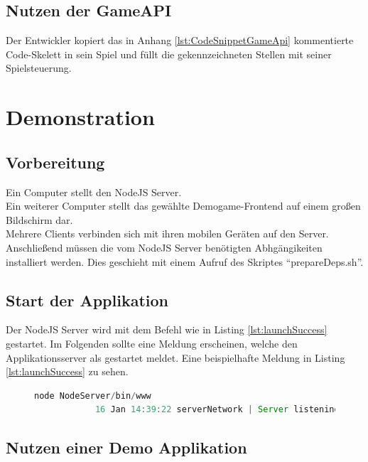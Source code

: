 \documentclass[a4paper]{spie}  %
\begin{document}
\subsection{Nutzen der GameAPI}
Der Entwickler kopiert das in Anhang \ref{lst:CodeSnippetGameApi} kommentierte Code-Skelett in sein Spiel und füllt die gekennzeichneten Stellen mit seiner Spielsteuerung.


\section{Demonstration}
\subsection{Vorbereitung}
Ein Computer stellt den NodeJS Server.\\
Ein weiterer Computer stellt das gewählte Demogame-Frontend auf einem großen Bildschirm dar.\\
Mehrere Clients verbinden sich mit ihren mobilen Geräten auf den Server.\\
Anschließend müssen die vom NodeJS Server benötigten Abhgängikeiten installiert werden. Dies geschieht mit einem Aufruf des Skriptes \enquote{prepareDeps.sh}.
\lstset{
  numbers=left,
  stepnumber=5,
  firstnumber=1,
  numberfirstline=true
}

\subsection{Start der Applikation}
Der NodeJS Server wird mit dem Befehl wie in Listing \ref{lst:launchSuccess} gestartet. Im Folgenden sollte eine Meldung erscheinen, welche den Applikationsserver als gestartet meldet. Eine beispielhafte Meldung in Listing \ref{lst:launchSuccess} zu sehen.

\begin{figure}[h!]
	\centering
        \begin{lstlisting}[language=JavaScript,caption={Start der Applikation},label={lst:launchSuccess}]
            node NodeServer/bin/www
            16 Jan 14:39:22 serverNetwork | Server listening on port 5222
        \end{lstlisting}
\end{figure}
\subsection{Nutzen einer Demo Applikation}
\end{document}
